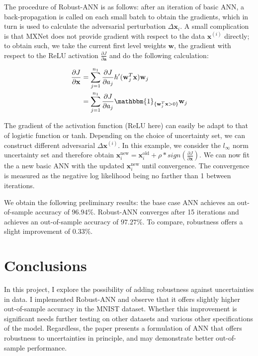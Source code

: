 \documentclass[twoside,12pt]{article}
\newcommand{\M}[1]{\boldsymbol{\mathbf{#1}}}
\begin{document}
The procedure of Robust-ANN is as follows: after an iteration of basic ANN, a back-propagation is called on each small batch to obtain the gradients, which in turn is used to calculate the adversarial perturbation $\Delta \M x_i$. A small complication is that \textsf{MXNet} does not provide gradient with respect to the data $\M x^{(i)}$ directly; to obtain such, we take the current first level weights $\M w$, the gradient with respect to the ReLU activation $\frac{\partial J}{\partial \M a}$ and do the following calculation:


\begin{equation}
\begin{aligned}
\frac{\partial J}{\partial \M x} 
& = \sum_{j=1}^{n_1} \frac{\partial J}{\partial a_j} h'(\M w_j^T \M x) \M w_j\\
& = \sum_{j=1}^{n_1} \frac{\partial J}{\partial a_j} \mathbbm{1}_{\{\M w_j^T \M x > 0 \} } \M w_j
\end{aligned}
\end{equation}

The gradient of the activation function (ReLU here) can easily be adapt to that of logistic function or tanh. Depending on the choice of uncertainty set, we can construct different adversarial $\Delta \M x^{(i)}$. In this example, we consider the $l_\infty$ norm uncertainty set and therefore obtain $\M x_i^{\textrm{new}} = \M x_i^{\textrm{old}} + \rho * sign(\frac{\partial J}{\partial \M x})$. We can now fit the a new basic ANN with the updated $\M x_i^{\textrm{new}}$ until convergence. The convergence is measured as the negative log likelihood being no farther than 1 between iterations.

We obtain the following preliminary results: the base case ANN achieves an out-of-sample accuracy of $96.94\%$. Robust-ANN converges after 15 iterations and achieves an out-of-sample accuracy of $97.27\%$. To compare, robustness offers a slight improvement of $0.33\%$. 


\section{Conclusions}
In this project, I explore the possibility of adding robustness against uncertainties in data. I implemented Robust-ANN and observe that it offers slightly higher out-of-sample accuracy in the MNIST dataset. Whether this improvement is significant needs further testing on other datasets and various other specifications of the model. Regardless, the paper presents a formulation of ANN that offers robustness to uncertainties in principle, and may demonstrate better out-of-sample performance.



\end{document}
